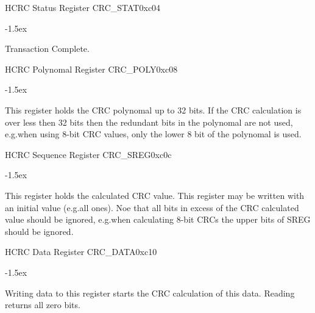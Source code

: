 \documentclass[12pt]{article}
\begin{document}
\begin{register}{H}{CRC Status Register CRC\_STAT}{0xc04}
\label{crcstat}
%
%
%
\regnewline%
\end{register}
\begin{regdesc}[0.8\textwidth]\begin{reglist}[000000000]
\itemsep-1.5ex
\item [TC] Transaction Complete.
\end{reglist}\end{regdesc}

\begin{register}{H}{CRC Polynomal Register CRC\_POLY}{0xc08}
\label{crcpoly}
\regnewline%
\end{register}
\begin{regdesc}[0.8\textwidth]\begin{reglist}[000000000]
\itemsep-1.5ex
\item [POLY] This register holds the CRC polynomal up to 32 bits. If the CRC calculation is over less then 32 bits then the redundant bits in the polynomal are not used, e.g.\@ when using 8-bit CRC values, only the lower 8 bit of the polynomal is used.
\end{reglist}\end{regdesc}

\begin{register}{H}{CRC Sequence Register CRC\_SREG}{0xc0c}
\label{crcsreg}
\regnewline%
\end{register}
\begin{regdesc}[0.8\textwidth]\begin{reglist}[000000000]
\itemsep-1.5ex
\item [SREG] This register holds the calculated CRC value. This register may be written with an initial value (e.g.\@ all ones). Noe that all bits in excess of the CRC calculated value should be ignored, e.g.\@ when calculating 8-bit CRCs the upper bits of SREG should be ignored.
\end{reglist}\end{regdesc}

\begin{register}{H}{CRC Data Register CRC\_DATA}{0xc10}
\label{crcdata}
%
\regnewline%
\end{register}
\begin{regdesc}[0.8\textwidth]\begin{reglist}[000000000]
\itemsep-1.5ex
\item [DATA] Writing data to this register starts the CRC calculation of this data. Reading returns all zero bits.
\end{reglist}\end{regdesc}
\end{document}
